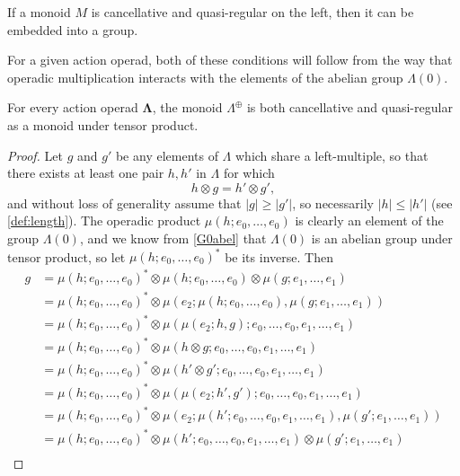 \documentclass{amsbook} %
\newcommand{\ML}{\mathbf{\Lambda}}
\newcommand{\LL}{\Lambda}
\numberwithin{section}{chapter}
\begin{document}
\begin{prop} If a monoid $M$ is cancellative and quasi-regular on the left, then it can be embedded into a group.
\end{prop}

For a given action operad, both of these conditions will follow from the way that operadic multiplication interacts with the elements of the abelian group $\Lambda(0)$.


\begin{prop} \label{cqr} For every action operad $\ML$, the monoid $\Lambda^{\oplus}$ is both cancellative and quasi-regular as a monoid under tensor product.
\end{prop}
\begin{proof}
Let $g$ and $g'$ be any elements of $\Lambda$ which share a left-multiple, so that there exists at least one pair $h, h'$ in $\Lambda$ for which
  \[
    h \otimes g = h' \otimes g',
  \]
and without loss of generality assume that $|g| \ge |g'|$, so necessarily $|h| \le |h'|$ (see \cref{def:length}). The operadic product $\mu(h; e_0, \ldots, e_0)$ is clearly an element of the group $\LL(0)$, and we know from \cref{G0abel} that $\LL(0)$ is an abelian group under tensor product, so let $\mu(h; e_0, \ldots, e_0)^*$ be its inverse. Then
  \begin{align*}
		g &= \mu(h; e_0, \ldots, e_0)^* \otimes \mu(h; e_0, \ldots, e_0) \otimes \mu(g; e_1, \ldots, e_1) \\
		&= \mu(h; e_0, \ldots, e_0)^* \otimes \mu\left( e_2 ; \mu(h; e_0, \ldots, e_0), \mu(g; e_1, \ldots, e_1) \right) \\
		&= \mu(h; e_0, \ldots, e_0)^* \otimes \mu\left( \mu(e_2; h, g) ; e_0, \ldots, e_0, e_1, \ldots, e_1 \right) \\
		&= \mu(h; e_0, \ldots, e_0)^* \otimes \mu\left( h \otimes g ; e_0, \ldots, e_0, e_1, \ldots, e_1 \right) \\
		&= \mu(h; e_0, \ldots, e_0)^* \otimes \mu\left( h' \otimes g' ; e_0, \ldots, e_0, e_1, \ldots, e_1 \right) \\
		&= \mu(h; e_0, \ldots, e_0)^* \otimes \mu\left( \mu(e_2; h', g') ; e_0, \ldots, e_0, e_1, \ldots, e_1 \right) \\
		&= \mu(h; e_0, \ldots, e_0)^* \otimes \mu\left( e_2 ; \mu(h'; e_0, \ldots, e_0, e_1, \ldots, e_1), \mu(g'; e_1, \ldots, e_1) \right) \\
		&= \mu(h; e_0, \ldots, e_0)^* \otimes \mu(h'; e_0, \ldots, e_0, e_1, \ldots, e_1) \otimes \mu(g'; e_1, \ldots, e_1) \\

\end{align*}
\end{proof}
\end{document}
